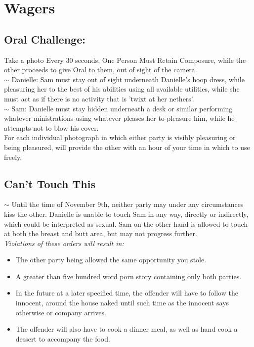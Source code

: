 
 \section{Wagers}
 \subsection{Oral Challenge:}
Take a photo Every 30 seconds, One Person Must Retain Composure, while the other proceeds to give Oral to them, 
out of sight of the camera.\\
  \indent $\sim$ \hspace{5mm} Danielle: Sam must stay out of sight underneath Danielle's hoop dress, while pleasuring 
  her to the best of his abilities using all available utilities, while she must
  act as if there is no activity that is 'twixt at her nethers'.\\
 \indent  $\sim$ \hspace{5mm}Sam: Danielle must stay hidden underneath a desk or similar performing whatever ministrations using 
  whatever pleases her to pleasure him, while he attempts not to blow his cover.\\

 
  For each individual photograph in which either party is visibly pleasuring or being pleasured, will provide the other 
  with an hour of your time in which to use freely.
 

 \subsection{Can't Touch This}

   \indent $\sim$ Until the time of November 9th, neither party may under any circumstances kiss the other. Danielle is 
   unable to touch Sam in any way, directly or indirectly, which could be interpreted as sexual. Sam on the other hand is
    allowed to touch at both the breast and butt area, but may not progress further. \\
    \textit{ Violations of these orders will result in: } 
    \begin{itemize}
      \item The other party being allowed the same opportunity you stole.
      \item A greater than five hundred word porn story containing only both parties.
      \item In the future at a later specified time, the offender will have to follow the innocent,
      around the house naked until such time as the innocent says otherwise or company arrives.
      \item The offender will also have to cook a dinner meal, as well as hand cook a dessert to
       accompany the food.  
    \end{itemize}


